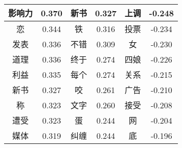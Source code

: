 \documentclass[11pt]{article}
\newcommand{\1}[1]{{\mathbf 1}\left\{#1\right\}}        %
\begin{document}
\begin{table}[hb]
\begin{center}
\begin{tabular}{|c|c||c|c||c|c|}
影响力 & 0.370 & 新书 & 0.327 & 上调 & -0.248\\ \hline
恋 & 0.344 & 铁 & 0.316 & 投票 & -0.234\\ \hline
发表 & 0.336 & 不错 & 0.309 & 女 & -0.230\\ \hline
道理 & 0.336 & 终于 & 0.274 & 四娘 & -0.226\\ \hline
利益 & 0.335 & 每个 & 0.274 & 关系 & -0.215\\ \hline
新书 & 0.327 & 咬 & 0.261 & 广告 & -0.210\\ \hline
称 & 0.323 & 文字 & 0.260 & 接受 & -0.208\\ \hline
遭受 & 0.323 & 蛋 & 0.244 & 网 & -0.204\\ \hline
媒体 & 0.319 & 纠缠 & 0.244 & 底 & -0.196\\ \hline
\end{tabular}
\end{center}
\end{table}
\end{document}
